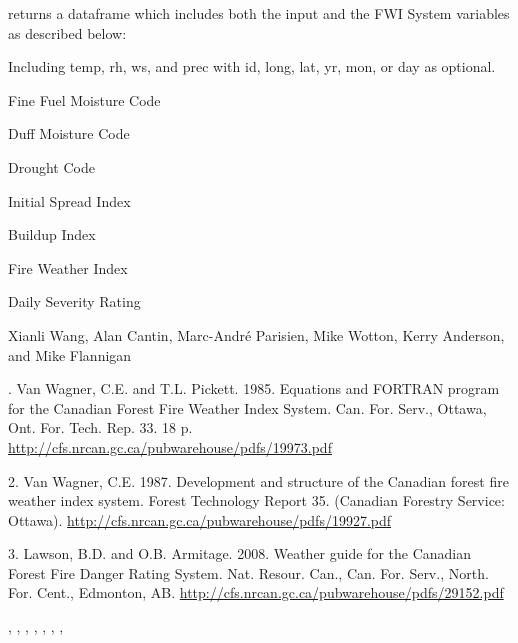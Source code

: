\documentclass[a4paper]{book}
\begin{document}
%
\begin{Value}
 returns a dataframe which includes both the input and the
FWI System variables as described below: \begin{ldescription}
\item[\code{Input Variables }] Including
temp, rh, ws, and prec with id, long, lat, yr, mon, or day as optional.
\item[\code{ffmc }] Fine Fuel Moisture Code\item[\code{dmc }] Duff Moisture Code
\item[\code{dc }] Drought Code\item[\code{isi }] Initial Spread Index\item[\code{bui
}] Buildup Index\item[\code{fwi }] Fire Weather Index\item[\code{dsr }] Daily Severity
Rating
\end{ldescription}
\end{Value}
%
\begin{Author}\relax
Xianli Wang, Alan Cantin, Marc-André Parisien, Mike Wotton, Kerry
Anderson, and Mike Flannigan
\end{Author}
%
\begin{References}. Van Wagner, C.E. and T.L. Pickett. 1985. Equations and
FORTRAN program for the Canadian Forest Fire Weather Index System. Can. For.
Serv., Ottawa, Ont. For. Tech. Rep. 33. 18 p.
\url{http://cfs.nrcan.gc.ca/pubwarehouse/pdfs/19973.pdf}

2. Van Wagner, C.E. 1987. Development and structure of the Canadian forest
fire weather index system. Forest Technology Report 35. (Canadian Forestry
Service: Ottawa). \url{http://cfs.nrcan.gc.ca/pubwarehouse/pdfs/19927.pdf}

3.  Lawson, B.D. and O.B. Armitage. 2008. Weather guide for the Canadian
Forest Fire Danger Rating System. Nat. Resour. Can., Can. For. Serv., North.
For. Cent., Edmonton, AB.
\url{http://cfs.nrcan.gc.ca/pubwarehouse/pdfs/29152.pdf}
\end{References}
%
\begin{SeeAlso}\relax
{}, , ,
, , ,
, 
\end{SeeAlso}
%
\end{document}
